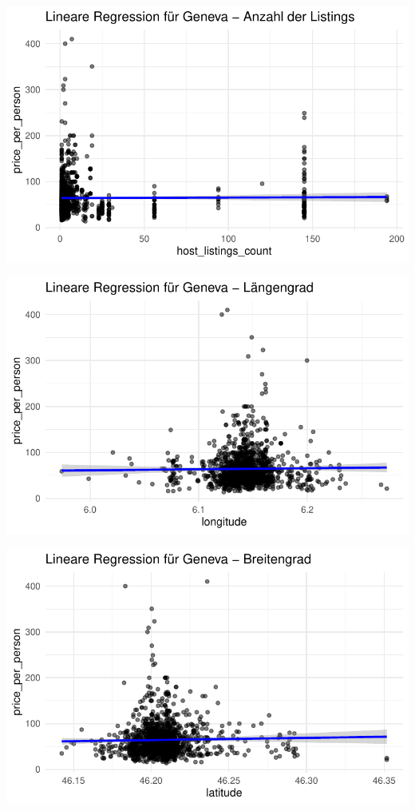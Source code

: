 \documentclass[
  journal,
]{IEEEtran}%
\begin{document}
\includegraphics{main_files/figure-pdf/unnamed-chunk-18-6.pdf}

\includegraphics{main_files/figure-pdf/unnamed-chunk-18-7.pdf}

\includegraphics{main_files/figure-pdf/unnamed-chunk-18-8.pdf}
\end{document}
